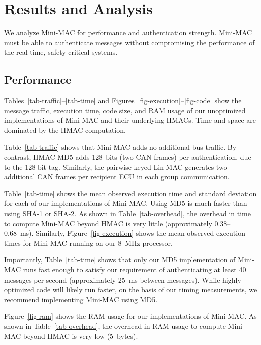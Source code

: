 \section{Results and Analysis}
\label{analysis}

We analyze Mini-MAC for performance and authentication strength. 
Mini-MAC must be able to authenticate messages 
without compromising the performance of the real-time, safety-critical systems.

\subsection{Performance}
\label{performance}

Tables~\ref{tab-traffic}--\ref{tab-time} and Figures~\ref{fig-execution}--\ref{fig-code}
show the message traffic, execution time, code size, and RAM usage of our unoptimized implementations
of Mini-MAC and their underlying HMACs.  Time and space are dominated by the HMAC computation.


Table~\ref{tab-traffic} shows that Mini-MAC adds no additional bus traffic.
By contrast, HMAC-MD5 adds 128~bits (two CAN frames) per authentication,
due to the 128-bit tag.  Similarly, the pairwise-keyed Lin-MAC generates
two additional CAN frames per recipient ECU in each group communication.

Table~\ref{tab-time} shows the mean observed execution time
and standard deviation for each of our implementations of Mini-MAC.
Using MD5 is much faster than using SHA-1 or SHA-2.  As shown in Table~\ref{tab-overhead},
the overhead in time to compute Mini-MAC beyond HMAC is very little (approximately 0.38--0.68~ms).
Similarly, Figure~\ref{fig-execution} shows the mean observed execution times for Mini-MAC 
running on our 8~MHz processor.

Importantly, Table~\ref{tab-time} shows that only our 
MD5 implementation of Mini-MAC runs fast enough to satisfy our
requirement of authenticating at least 40 messages per second (approximately
25~ms between messages).   
While highly optimized code will likely run faster, on the
basis of our timing measurements, we recommend implementing Mini-MAC using MD5.

Figure~\ref{fig-ram} shows the RAM usage for our implementations of Mini-MAC.
As shown in Table~\ref{tab-overhead}, the overhead in RAM usage to compute Mini-MAC
beyond HMAC is very low (5~bytes).

